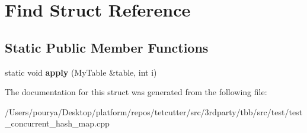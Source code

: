 \hypertarget{structFind}{}\section{Find Struct Reference}
\label{structFind}
\subsection*{Static Public Member Functions}
\begin{DoxyCompactItemize}
\item 
\hypertarget{structFind_ac166d4ee7ab7096b77d836fb38c63091}{}static void {\bfseries apply} (My\+Table \&table, int i)\label{structFind_ac166d4ee7ab7096b77d836fb38c63091}

\end{DoxyCompactItemize}


The documentation for this struct was generated from the following file\+:\begin{DoxyCompactItemize}
\item 
/\+Users/pourya/\+Desktop/platform/repos/tetcutter/src/3rdparty/tbb/src/test/test\+\_\+concurrent\+\_\+hash\+\_\+map.\+cpp\end{DoxyCompactItemize}
